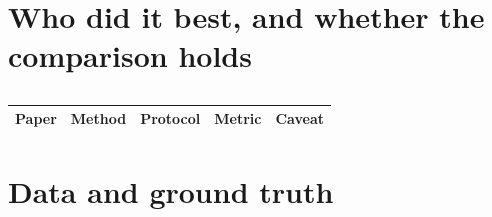 \documentclass[10pt]{article}
\begin{document}

\section{Who did it best, and whether the comparison holds}
\begin{table}[H]
  \centering\small
  \caption{%
  }
  \begin{tabular}{@{}llllp{4.2cm}@{}}
    \toprule
    Paper & Method & Protocol & Metric & Caveat \\
    \midrule
    \bottomrule
  \end{tabular}
\end{table}


\section{Data and ground truth}
\end{document}
